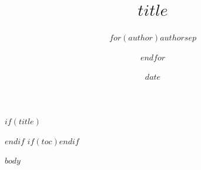 \documentclass[$if(fontsize)$$fontsize$,$endif$$for(classoption)$$classoption$$sep$,$endfor$]{$if(documentclass)$$documentclass$$else$article$endif$}
\title{$title$}
\author{$for(author)$$author$$sep$ \and $endfor$}
\date{$date$}
\begin{document}
$if(title)$\maketitle$endif$
$if(toc)$\tableofcontents$endif$

$body$
\end{document}
